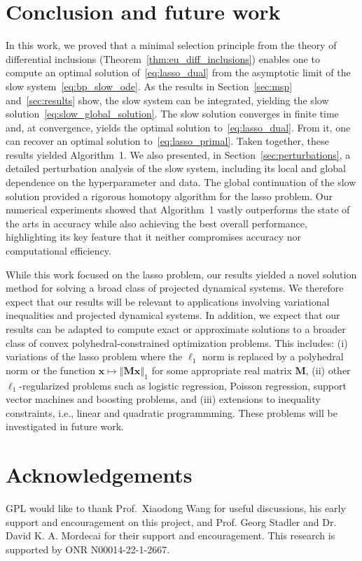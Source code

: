 \documentclass[11pt]{article}
\numberwithin{prop}{section}
\numberwithin{lem}{section}
\numberwithin{rem}{section}
\numberwithin{cor}{section}
\numberwithin{thm}{section}
\numberwithin{defn}{section}
\numberwithin{fact}{section}
\theoremstyle{plain}
\def\bx {\boldsymbol{x}}
\newcommand{\normone}[1]{\left\Vert{#1} \right\Vert_{1}}
\newcommand{\matr}[1]{\bm{#1}}
\begin{document}
\section{Conclusion and future work}\label{sec:discussion}
In this work, we proved that a minimal selection principle from the theory of differential inclusions (Theorem~\ref{thm:eu_diff_inclusions}) enables one to compute an optimal solution of~\eqref{eq:lasso_dual} from the asymptotic limit of the slow system~\eqref{eq:bp_slow_ode}. As the results in Section~\ref{sec:msp} and~\ref{sec:results} show, the slow system can be integrated, yielding the slow solution~\eqref{eq:slow_global_solution}. The slow solution converges in finite time and, at convergence, yields the optimal solution to~\eqref{eq:lasso_dual}. From it, one can recover an optimal solution to~\eqref{eq:lasso_primal}. Taken together, these results yielded Algorithm~1. We also presented, in Section~\ref{sec:perturbations}, a detailed perturbation analysis of the slow system, including its local and global dependence on the hyperparameter and data. The global continuation of the slow solution provided a rigorous homotopy algorithm for the lasso problem. Our numerical experiments showed that Algorithm~1 vastly outperforms the state of the arts in accuracy while also achieving the best overall performance, highlighting its key feature that it neither compromises accuracy nor computational efficiency.


While this work focused on the lasso problem, our results yielded a novel solution method for solving a broad class of projected dynamical systems. We therefore expect that our results will be relevant to applications involving variational inequalities and projected dynamical systems. In addition, we expect that our results can be adapted to compute exact or approximate solutions to a broader class of convex polyhedral-constrained optimization problems. This includes: (i) variations of the lasso problem where the $\ell_{1}$ norm is replaced by a polyhedral norm or the function $\bx \mapsto \normone{\matr{M}\bx}$ for some appropriate real matrix $\matr{M}$, (ii) other $\ell_{1}$-regularized problems such as logistic regression, Poisson regression, support vector machines and boosting problems, and (iii) extensions to inequality constraints, i.e., linear and quadratic programmming. These problems will be investigated in future work.


\section*{Acknowledgements}
GPL would like to thank Prof.~Xiaodong Wang for useful discussions, his early support and encouragement on this project, and Prof. Georg Stadler and Dr. David K. A. Mordecai for their support and encouragement. This research is supported by ONR N00014-22-1-2667.
\end{document}
